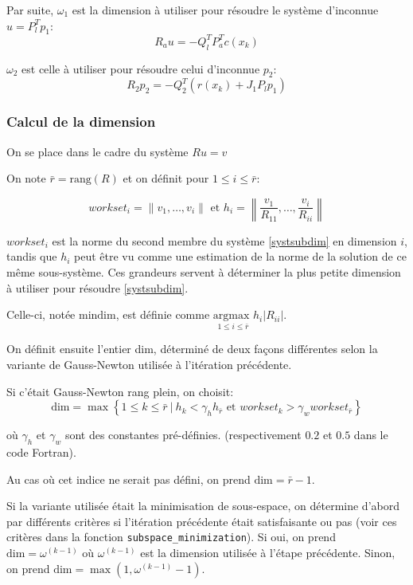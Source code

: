 \documentclass[a4paper,11pt]{article}
\numberwithin{equation}{section}
\begin{document}
Par suite, $\omega_{1}$ est la dimension à utiliser pour résoudre le système d'inconnue $u=P_l^{T}p_1$: $$R_{a}u = -Q_l^TP_{a}^Tc(x_{k})$$

 $\omega_{2}$ est celle à utiliser pour résoudre celui d'inconnue $p_{2}$: $$R_{2}p_2 = -Q_2^T(r(x_{k}) + J_1P_lp_1)$$ 
 
 \subsubsection{Calcul de la dimension}
 
 On se place dans le cadre du système $Ru=v$
 
 On note $\bar{r}=\text{rang}(R)$ et on définit pour $1\leq i \leq \bar{r}$:
\newcommand{\ws}{workset}
 
 $$\ws_{i} = \|v_{1},\ldots, v_{i}\| \text{ et } h_{i}=\left \|\frac{v_{1}}{R_{11}},\ldots,\frac{v_{i}}{R_{ii}} \right \|$$
 
 $\ws_{i}$ est la norme du second membre du système \ref{systsubdim} en dimension $i$, tandis que $h_{i}$ peut être vu comme une estimation de la norme de la solution de ce même sous-système. Ces grandeurs servent à déterminer la plus petite dimension à utiliser pour résoudre \ref{systsubdim}.
 
 Celle-ci, notée $\text{mindim}$, est définie comme $\underset{1\leq i \leq \bar{r}}{\text{argmax }} h_{i}|R_{ii}|$.
 
On définit ensuite l'entier dim, déterminé de deux fa\c cons différentes selon la variante de Gauss-Newton utilisée à l'itération précédente.

Si c'était Gauss-Newton rang plein, on choisit:
$$
\text{dim}= \max \left\{ 1\leq k \leq \bar{r}\ | \ h_{k} < \gamma_{h}h_{\bar{r}} \text{ et } \ws_{k} > \gamma_{w}\ws_{\bar{r}} \right\}
$$

où $\gamma_{h}$ et $\gamma_{w}$ sont des constantes pré-définies. (respectivement $0.2$ et $0.5$ dans le code Fortran).

Au cas où cet indice ne serait pas défini, on prend $\text{dim}=\bar{r}-1$.

Si la variante utilisée était la minimisation de sous-espace, on détermine d'abord par différents critères si l'itération précédente était satisfaisante ou pas (voir ces critères dans la fonction \texttt{subspace\_minimization}). Si oui, on prend  $\text{dim}=\omega^{(k-1)}$ où $\omega^{(k-1)}$ est la dimension utilisée à l'étape précédente. Sinon, on prend $\text{dim}=\max(1,\omega^{(k-1)}-1)$.
\end{document}
